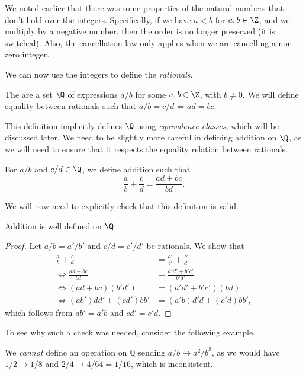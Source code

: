 \begin{remark}[Caveats]
	We noted earlier that there was some properties of the natural numbers that don't hold over the integers. Specifically, if we have $a < b$ for $a, b \in \Z$, and we multiply by a negative number, then the order is no longer preserved (it is switched). Also, the cancellation law only applies when we are cancelling a non-zero integer.
\end{remark}

We can now use the integers to define the \emph{rationals}.

\begin{definition}[Rationals]
	The  are a set $\Q$ of expressions $a/b$ for some $a, b \in \Z$, with $b \neq 0$. We will define equality between rationals such that $a/b = c/d \iff ad = bc$. 
\end{definition}

This definition implicitly defines $\Q$ using \emph{equivalence classes}, which will be discussed later. 
We need to be slightly more careful in defining addition on $\Q$, as we will need to ensure that it respects the equality relation between rationals. 

\begin{definition}[Addition on $\Q$]
	For $a/b$ and $c/d \in \Q$, we define addition such that
	$$
	\frac{a}{b} + \frac{c}{d} = \frac{ad + bc}{bd}.
	$$
\end{definition}

We will now need to explicitly check that this definition is valid.
\begin{proposition}
	Addition is well defined on $\Q$.
\end{proposition}
\begin{proof}
	Let $a/b = a'/b'$ and $c/d = c'/d'$ be rationals. We show that
\begin{align*}
	\frac{a}{b} + \frac{c}{d} &= \frac{a'}{b'} + \frac{c'}{d'} \\
\iff \frac{ad + bc}{bd} &= \frac{a'd' + b'c'}{b'd'} \\
\iff (ad + bc)(b'd') &= (a'd' + b'c')(bd) \\
\iff (ab')dd' + (cd')bb' &= (a'b)d'd + (c'd)bb', 
\end{align*}
which follows from $ab' = a'b$ and $cd' = c'd$.
\end{proof}

To see why such a check was needed, consider the following example.

\begin{example}
	We \emph{cannot} define an operation on $\mathbb{Q}$ sending $a/b \rightarrow a^2 / b^3$, as we would have $1/2 \rightarrow 1/8$ and $2/4 \rightarrow 4/64 = 1/16$, which is inconsistent.
\end{example}


